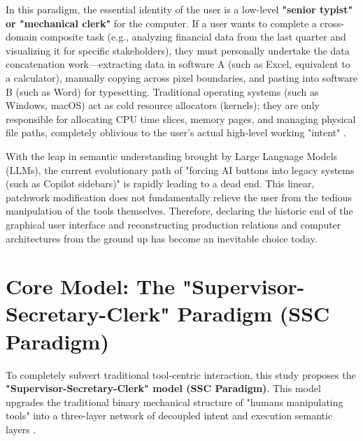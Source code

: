 \documentclass[11pt,a4paper]{article}
\begin{document}
In this paradigm, the essential identity of the user is a low-level \textbf{"senior typist" or "mechanical clerk"} for the computer. If a user wants to complete a cross-domain composite task (e.g., analyzing financial data from the last quarter and visualizing it for specific stakeholders), they must personally undertake the data concatenation work---extracting data in software A (such as Excel, equivalent to a calculator), manually copying across pixel boundaries, and pasting into software B (such as Word) for typesetting. Traditional operating systems (such as Windows, macOS) act as cold resource allocators (kernels); they are only responsible for allocating CPU time slices, memory pages, and managing physical file paths, completely oblivious to the user's actual high-level working "intent" \cite{winograd1997}.

With the leap in semantic understanding brought by Large Language Models (LLMs), the current evolutionary path of "forcing AI buttons into legacy systems (such as Copilot sidebars)" is rapidly leading to a dead end. This linear, patchwork modification does not fundamentally relieve the user from the tedious manipulation of the tools themselves. Therefore, declaring the historic end of the graphical user interface and reconstructing production relations and computer architectures from the ground up has become an inevitable choice today.

\section{Core Model: The "Supervisor-Secretary-Clerk" Paradigm (SSC Paradigm)}

To completely subvert traditional tool-centric interaction, this study proposes the \textbf{"Supervisor-Secretary-Clerk" model (SSC Paradigm)}. This model upgrades the traditional binary mechanical structure of "humans manipulating tools" into a three-layer network of decoupled intent and execution semantic layers \cite{xi2023}.
\end{document}
